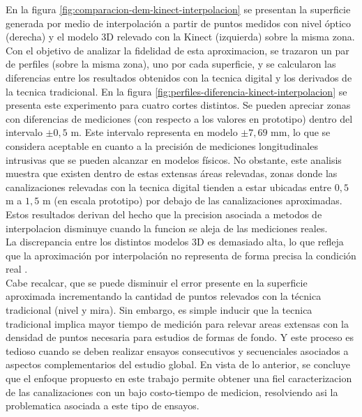 En la figura \ref{fig:comparacion-dem-kinect-interpolacion} se presentan la superficie generada por medio de interpolación a partir de puntos medidos con nivel óptico (derecha) y el modelo 3D relevado con la Kinect (izquierda) sobre la misma zona. \\
Con el objetivo de analizar la fidelidad de esta aproximacion, se trazaron un par de perfiles (sobre la misma zona), uno por cada superficie, y se calcularon las diferencias entre los resultados obtenidos con la tecnica digital y los derivados de la tecnica tradicional. En la figura \ref{fig:perfiles-diferencia-kinect-interpolacion} se presenta este experimento para cuatro cortes distintos. Se pueden apreciar zonas con diferencias de mediciones (con respecto a los valores en prototipo) dentro del intervalo $\pm0,5$ m. Este intervalo representa en modelo $\pm 7,69$ mm, lo que se considera aceptable en cuanto a la precisión de mediciones longitudinales intrusivas que se pueden alcanzar en modelos físicos. No obstante, este analisis muestra que existen dentro de estas extensas áreas relevadas, zonas donde las canalizaciones relevadas con la tecnica digital tienden a estar ubicadas entre $0,5$ m a $1,5$ m (en escala prototipo) por debajo de las canalizaciones aproximadas. Estos resultados derivan del hecho que la precision asociada a metodos de interpolacion disminuye cuando la funcion se aleja de las mediciones reales. \\
La discrepancia entre los distintos modelos 3D es demasiado alta, lo que refleja que la aproximación por interpolación no representa de forma precisa la condición real . \\
Cabe recalcar, que se puede disminuir el error presente en la superficie aproximada incrementando la cantidad de puntos relevados con la técnica tradicional (nivel y mira). Sin embargo, es simple inducir que la tecnica tradicional implica mayor tiempo de medición para relevar areas extensas con la densidad de puntos necesaria para estudios de formas de fondo. Y este proceso es tedioso cuando se deben realizar ensayos consecutivos y secuenciales asociados a aspectos complementarios del estudio global. En vista de lo anterior, se concluye que el enfoque propuesto en este trabajo permite obtener una fiel caracterizacion de las canalizaciones con un bajo costo-tiempo de medicion, resolviendo asi la problematica asociada a este tipo de ensayos. \\

